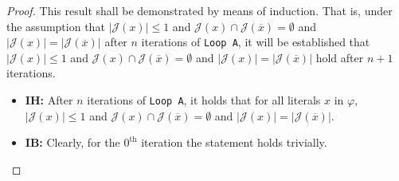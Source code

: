 \documentclass [11pt]{article}
\newcommand{\True}{\mathbf{true}}
\newcommand{\False}{\mathbf{false}}
\newcommand{\lit}{\mathit{Lit}}
\newcommand{\reach}{\leadsto}
\begin{document}
\begin{proof}
This result shall be demonstrated by means of induction. That is, under the assumption that $|\mathcal{J}(x)|\leq 1$ and $\mathcal{J}(x) \cap \mathcal{J}(\overline{x}) = \emptyset$ and $|\mathcal{J}(x) |= |\mathcal{J}(\overline{x})|$ after $n$  iterations of \texttt{Loop A}, it will be established that $|\mathcal{J}(x)|\leq 1$ and $\mathcal{J}(x) \cap \mathcal{J}(\overline{x}) = \emptyset$ and $|\mathcal{J}(x)| = |\mathcal{J}(\overline{x})|$ hold after $n+1$ iterations.
\begin{itemize}
\item \textbf{IH:} After $n$ iterations of \texttt{Loop A}, it holds that for all literals $x$ in $\varphi$, $|\mathcal{J}(x)|\leq 1$ and $\mathcal{J}(x) \cap \mathcal{J}(\overline{x}) = \emptyset$ and $|\mathcal{J}(x)| = |\mathcal{J}(\overline{x})|$.
\item \textbf{IB:} Clearly, for the $0^{\text{th}}$ iteration the statement holds trivially.
%
%  
%  
%
%  
%   


\end{itemize}
\end{proof}
\end{document}
